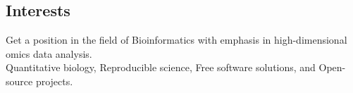 \documentclass[margin,line]{res}
\begin{document}
\address{Calle Tambo Huascar 201, San Miguel, Lima - Peru}
\address{avallecam@gmail.com, @avallecam, (+51)950951722}

\begin{resume}

\vspace*{.15in}

\section{\sc Interests}%

Get a position in the field of Bioinformatics with emphasis in high-dimensional omics data analysis.\\
Quantitative biology, Reproducible science, Free software solutions, and Open-source projects.%




\end{resume}
\end{document}
